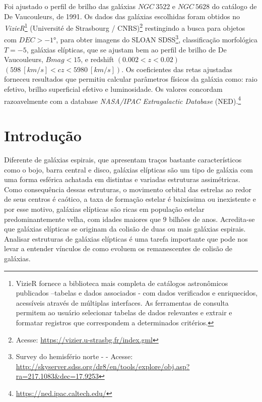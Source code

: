 \documentclass[a4paper, 11pt, fleqn, leqno]{article}
\begin{document}
Foi ajustado o perfil de brilho das galáxias $NGC ~ 3522$ e $NGC ~ 5628$ do catálogo de De Vaucouleurs, de 1991. Os dados das galáxias escolhidas foram obtidos no \textit{VizieR}\footnote{VizieR fornece a biblioteca mais completa de catálogos astronômicos publicados --tabelas e dados associados - com dados verificados e enriquecidos, acessíveis através de múltiplas interfaces. As ferramentas de consulta permitem ao usuário selecionar tabelas de dados relevantes e extrair e formatar registros que correspondem a determinados critérios.} (Université de Strasbourg / CNRS)\footnote{Acesse: \url{https://vizier.u-strasbg.fr/index.gml}} restingindo a busca para objetos com $DEC > -1$°, para obter imagens do SLOAN SDSS\footnote{Survey do hemisfério norte - - Acesse: \url{http://skyserver.sdss.org/dr8/en/tools/explore/obj.asp?ra=217.1083&dec=17.9253}}, classificação morfológica $T = -5$, galáxias elípticas, que se ajustam bem ao perfil de brilho de De Vaucouleurs, $Bmag < 15$, e redshift $(0.002 < z < 0.02)$ $(598 ~ [km/s] < cz < 5980 ~ [km/s])$. Os coeficientes das retas ajustadas forneceu resultados que permitiu calcular parâmetros físicos da galáxia como: raio efetivo, brilho superficial efetivo e luminosidade. Os valores concordam razoavelmente com a database \textit{NASA/IPAC Extragalactic Database} (NED).\footnote{\url{https://ned.ipac.caltech.edu/}}

\section{Introdução}

\noindent Diferente de galáxias espirais, que apresentam traços bastante característicos como o bojo, barra central e disco,  galáxias elípticas são um tipo de galáxia com uma forma esférica achatada em distintas e variadas estruturas assimétricas.\\

\noindent Como consequência dessas estruturas, o movimento orbital das estrelas ao redor de seus centros é caótico, a taxa de formação estelar é baixíssima ou inexistente e por esse motivo, galáxias elípticas são ricas em população estelar predominantemente velha, com idades maiores que $9$ bilhões de anos. Acredita-se que galáxias elípticas se originam da colisão de duas ou mais galáxias espirais.\\

\noindent Analisar estruturas de galáxias elípticas é uma tarefa importante que pode nos levar a entender vínculos de como evoluem os remanescentes de colisão de galáxias.\\
\end{document}
